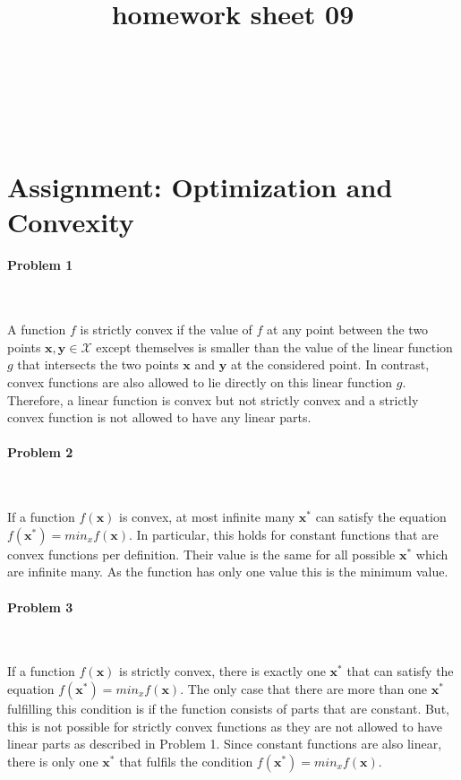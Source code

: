 \documentclass{article}
\title{homework sheet 09}
\author{
\name{Andre Seitz}\\
\imat{03622870}\\
\email{andre.seitz@mytum.de}
\And
\name{Linda Leidig} \\
\imat{03608416}\\
\email{linda.leidig@tum.de}
}
\renewcommand{\Vec}[1]{\ensuremath{\mathbf{#1}}}
\begin{document}
\maketitle

\section{Assignment: Optimization and Convexity}
\paragraph*{Problem 1}
$\;$ 

A function $f$ is strictly convex if the value of $f$ at any point between the two points $\Vec{x},\Vec{y} \in \mathcal{X}$ except themselves is smaller than the value of the linear function $g$ that intersects the two points $\Vec{x}$ and $\Vec{y}$ at the considered point. In contrast, convex functions are also allowed to lie directly on this linear function $g$. Therefore, a linear function is convex but not strictly convex and a strictly convex function is not allowed to have any linear parts.

\paragraph*{Problem 2}
$\;$ 

If a function $f(\Vec{x})$ is convex, at most infinite many $\Vec{x}^*$ can satisfy the equation $f(\Vec{x}^*) = min_xf(\Vec{x})$. In particular, this holds for constant functions that are convex functions per definition. Their value is the same for all possible $\Vec{x}^*$ which are infinite many. As the function has only one value this is the minimum value.

\paragraph*{Problem 3}
$\;$ 

If a function $f(\Vec{x})$ is strictly convex, there is exactly one $\Vec{x}^*$ that can satisfy the equation $f(\Vec{x}^*) = min_xf(\Vec{x})$. The only case that there are more than one $\Vec{x}^*$ fulfilling this condition is if the function consists of parts that are constant. But, this is not possible for strictly convex functions as they are not allowed to have linear parts as described in Problem 1. Since constant functions are also linear, there is only one $\Vec{x}^*$ that fulfils the condition $f(\Vec{x}^*) = min_xf(\Vec{x})$.
\end{document}
